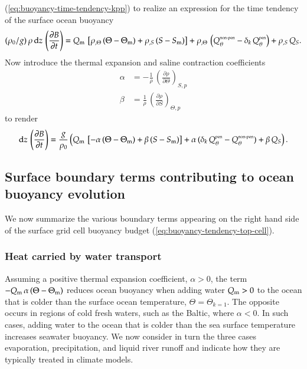 (\ref{eq:buoyancy-time-tendency-kpp}) to realize an expression for the
time tendency of the surface ocean buoyancy
\begin{equation}
  (\rho_{0}/g) \, \rho \, \mathrm{d}z \, \left( \frac{\partial B}{\partial t} \right)
  =
  Q_{\mbox{\scriptsize m}} \, \left[  \rho_{,\Theta} \, (\Theta - \Theta_{\mbox{\scriptsize m}})  
                   + \rho_{,S} \, (S - S_{\mbox{\scriptsize m}}) \right]
+ \rho_{,\Theta} \, \left( Q_{\theta}^{\mbox{\tiny non-pen}} - \delta_{k} \, Q_{\theta}^{\mbox{\tiny pen}} \right)  
+ \rho_{,S} \, Q_{S}.
\end{equation}
Now introduce the thermal expansion and saline contraction
coefficients
\begin{align}
 \alpha &= -\frac{1}{\rho} \, \left( \frac{\partial \rho}{\partial \Theta} \right)_{S,p} 
\label{eq:alpha-kpp}
\\
\beta &= \frac{1}{\rho} \, \left( \frac{\partial \rho}{\partial S} \right)_{\Theta,p}
\label{eq:beta-kpp}
\end{align}
to render 
\begin{equation}
 \mathrm{d}z \, \left( \frac{\partial B}{\partial t} \right)
  =
 \frac{g}{\rho_{0}} \left( 
 Q_{\mbox{\scriptsize m}} \, \left[ -\alpha \, (\Theta - \Theta_{\mbox{\scriptsize m}}) +  \beta \, (S - S_{\mbox{\scriptsize m}}) \right]
 + \alpha \, ( \delta_{k} \, Q_{\theta}^{\mbox{\tiny pen}} - Q_{\theta}^{\mbox{\tiny non-pen}} )
 + \beta \, Q_{S} \right). 
\label{eq:buoyancy-tendency-top-cell}
\end{equation}


\subsection{Surface boundary terms contributing to ocean buoyancy
  evolution}

We now summarize the various boundary terms appearing on the right
hand side of the surface grid cell buoyancy budget
(\ref{eq:buoyancy-tendency-top-cell}).


\subsubsection{Heat carried by water transport}

Assuming a positive thermal expansion coefficient, $\alpha > 0$, the
term $-Q_{\mbox{\scriptsize m}} \, \alpha \, (\Theta - \Theta_{\mbox{\scriptsize m}})$ reduces ocean buoyancy
when adding water $Q_{\mbox{\scriptsize m}} > 0$ to the ocean that is colder than the
surface ocean temperature, $\Theta = \Theta_{k=1}$.  The opposite
occurs in regions of cold fresh waters, such as the Baltic, where
$\alpha < 0$.  In such cases, adding water to the ocean that is colder
than the sea surface temperature increases seawater buoyancy.  We now
consider in turn the three cases evaporation, precipitation, and
liquid river runoff and indicate how they are typically treated in
climate models.

